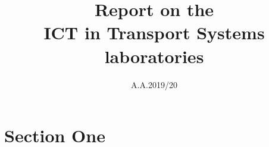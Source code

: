 \documentclass[a4paper, 12pt]{article}
\begin{document}
\title{Report on the\\ICT in Transport Systems\\laboratories}
\date{A.A.2019/20}

\begin{titlepage}
	\maketitle
\end{titlepage}
\clearpage
\tableofcontents
{}
\clearpage

\section{Section One}

\clearpage


















\vfill
\end{document}
